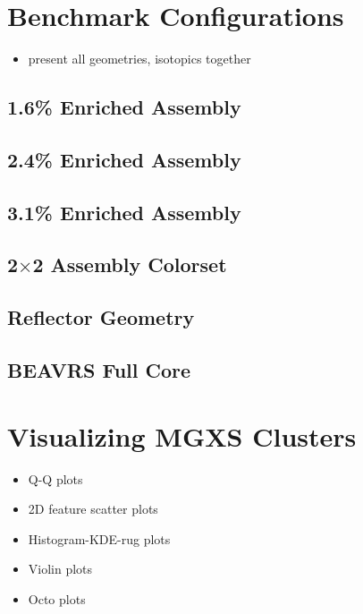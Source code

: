 \section{Benchmark Configurations}
\label{sec:chap7-benchmarks}

\begin{itemize}[noitemsep]
  \item present all geometries, isotopics together
\end{itemize}

\subsection{1.6\% Enriched Assembly}

\subsection{2.4\% Enriched Assembly}

\subsection{3.1\% Enriched Assembly}

\subsection{2$\times$2 Assembly Colorset}

\subsection{Reflector Geometry}

\subsection{BEAVRS Full Core}


\section{Visualizing MGXS Clusters}
\label{sec:chap7-visuals}

\begin{itemize}[noitemsep]
  \item Q-Q plots
  \item 2D feature scatter plots
  \item Histogram-KDE-rug plots
  \item Violin plots
  \item Octo plots
\end{itemize}



